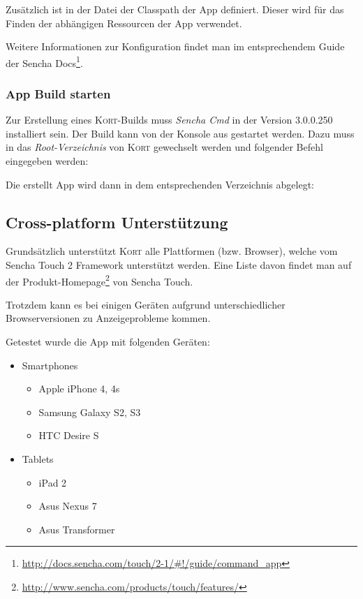Zusätzlich ist in der Datei  der Classpath der App definiert.
Dieser wird für das Finden der abhängigen Ressourcen der App verwendet.

Weitere Informationen zur Konfiguration findet man im entsprechendem Guide der Sencha Docs\footnote{\url{http://docs.sencha.com/touch/2-1/\#!/guide/command\_app}}.

\subsubsection{App Build starten}
Zur Erstellung eines \textsc{Kort}-Builds muss \emph{Sencha Cmd} in der Version 3.0.0.250 installiert sein.
Der Build kann von der Konsole aus gestartet werden. Dazu muss in das \emph{Root-Verzeichnis} von \textsc{Kort} gewechselt werden und folgender Befehl eingegeben werden:


Die erstellt App wird dann in dem entsprechenden Verzeichnis abgelegt:


\subsection{Cross-platform Unterstützung}
\label{cross-platform}
Grundsätzlich unterstützt \textsc{Kort} alle Plattformen (bzw. Browser), welche vom Sencha Touch 2 Framework unterstützt werden.
Eine Liste davon findet man auf der Produkt-Homepage\footnote{\url{http://www.sencha.com/products/touch/features/}} von Sencha Touch.

Trotzdem kann es bei einigen Geräten aufgrund unterschiedlicher Browserversionen zu Anzeigeprobleme kommen.

Getestet wurde die App mit folgenden Geräten:

\begin{itemize}
	\item Smartphones
	\begin{itemize}
		\item Apple iPhone 4, 4s
		\item Samsung Galaxy S2, S3
		\item HTC Desire S
	\end{itemize}
	\item Tablets
	\begin{itemize}
		\item iPad 2
		\item Asus Nexus 7
		\item Asus Transformer
	\end{itemize}
\end{itemize}

